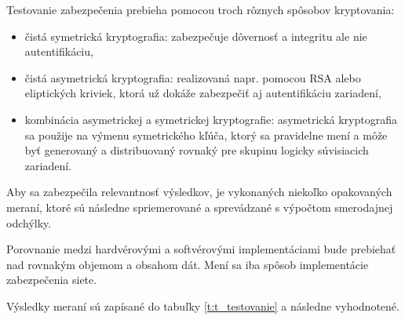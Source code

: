 \documentclass[12pt,a4wide,oneside,openright]{report}
\begin{document}
Testovanie zabezpečenia prebieha pomocou troch rôznych spôsobov kryptovania:
\begin{itemize}
	\item čistá symetrická kryptografia: zabezpečuje dôvernosť a integritu ale nie autentifikáciu,
	\item čistá asymetrická kryptografia: realizovaná napr. pomocou RSA alebo eliptických kriviek, ktorá už dokáže zabezpečiť aj autentifikáciu zariadení,
	\item kombinácia asymetrickej a symetrickej kryptografie: asymetrická kryptografia sa použije na výmenu symetrického kľúča, ktorý sa pravidelne mení a môže byť generovaný a distribuovaný rovnaký pre skupinu logicky súvisiacich zariadení.
\end{itemize}
\onehalfspacing


Aby sa zabezpečila relevantnosť výsledkov, je vykonaných niekoľko opakovaných meraní, ktoré sú následne spriemerované a sprevádzané s výpočtom smerodajnej odchýlky.

Porovnanie medzi hardvérovými a softvérovými implementáciami bude prebiehať nad rovnakým objemom a obsahom dát. Mení sa iba spôsob implementácie zabezpečenia siete.

Výsledky meraní sú zapísané do tabuľky \ref{t:t_testovanie} a následne vyhodnotené.


	\begin{table}[h]
		\centering
		\caption{Tabuľka pre zápis výsledkov z testovania.}
		\label{t:t_testovanie}
	\end{table}
\end{document}
